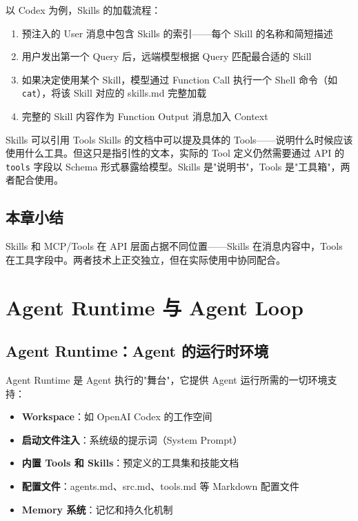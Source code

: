 \documentclass[a4paper]{article}
\begin{document}
以 Codex 为例，Skills 的加载流程：

\begin{enumerate}
    \item 预注入的 User 消息中包含 Skills 的索引——每个 Skill 的名称和简短描述
    \item 用户发出第一个 Query 后，远端模型根据 Query 匹配最合适的 Skill
    \item 如果决定使用某个 Skill，模型通过 Function Call 执行一个 Shell 命令（如 \texttt{cat}），将该 Skill 对应的 skills.md 完整加载
    \item 完整的 Skill 内容作为 Function Output 消息加入 Context
\end{enumerate}

\begin{knowledgebox}{Skills 可以引用 Tools}
Skills 的文档中可以提及具体的 Tools——说明什么时候应该使用什么工具。但这只是指引性的文本，实际的 Tool 定义仍然需要通过 API 的 \texttt{tools} 字段以 Schema 形式暴露给模型。Skills 是"说明书"，Tools 是"工具箱"，两者配合使用。
\end{knowledgebox}

\subsection{本章小结}

Skills 和 MCP/Tools 在 API 层面占据不同位置——Skills 在消息内容中，Tools 在工具字段中。两者技术上正交独立，但在实际使用中协同配合。


\section{Agent Runtime 与 Agent Loop}

\subsection{Agent Runtime：Agent 的运行时环境}

Agent Runtime 是 Agent 执行的"舞台"，它提供 Agent 运行所需的一切环境支持：

\begin{itemize}
    \item \textbf{Workspace}：如 OpenAI Codex 的工作空间
    \item \textbf{启动文件注入}：系统级的提示词（System Prompt）
    \item \textbf{内置 Tools 和 Skills}：预定义的工具集和技能文档
    \item \textbf{配置文件}：agents.md、src.md、tools.md 等 Markdown 配置文件
    \item \textbf{Memory 系统}：记忆和持久化机制
\end{itemize}
\end{document}
